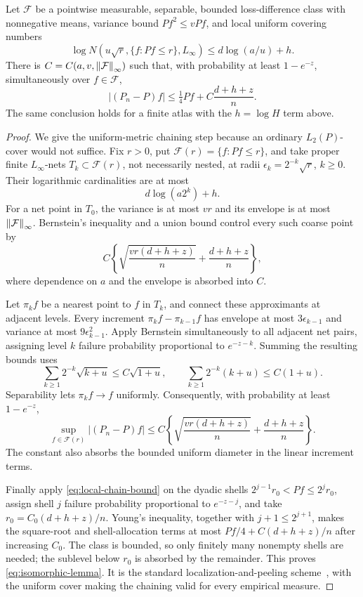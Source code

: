 \begin{lemma}
\label{lem:local-deviation}
Let \(\mathcal F\) be a pointwise measurable, separable, bounded loss-difference class with nonnegative means, variance bound \(Pf^2\le vPf\), and local uniform covering numbers
\[
\log N(u\sqrt r,\{f:Pf\le r\},L_\infty)
\le d\log(a/u)+h.
\]
There is \(C=C(a,v,\left\lVert \mathcal F\right\rVert_\infty)\) such that, with probability at least \(1-e^{-z}\), simultaneously over \(f\in\mathcal F\),
\begin{equation}
|(P_n-P)f|\le\tfrac14Pf+C\frac{d+h+z}{n}.
\label{eq:isomorphic-lemma}
\end{equation}
The same conclusion holds for a finite atlas with the \(h=\log H\) term above.
\end{lemma}

\begin{proof}
We give the uniform-metric chaining step because an ordinary
\(L_2(P)\)-cover would not suffice. Fix \(r>0\), put
\(\mathcal F(r)=\{f:Pf\le r\}\), and take proper finite
\(L_\infty\)-nets \(T_k\subset\mathcal F(r)\), not necessarily nested, at radii
\(\epsilon_k=2^{-k}\sqrt r\), \(k\ge0\). Their logarithmic cardinalities are
at most
\[
 d\log(a2^k)+h.
\]
For a net point in \(T_0\), the variance is at most \(vr\) and its envelope
is at most \(\left\lVert \mathcal F\right\rVert_\infty\). Bernstein's inequality and a union
bound control every such coarse point by
\[
 C\left\{\sqrt{\frac{vr(d+h+z)}n}
 +\frac{d+h+z}{n}\right\},
\]
where dependence on \(a\) and the envelope is absorbed into \(C\).

Let \(\pi_kf\) be a nearest point to \(f\) in \(T_k\), and connect these
approximants at adjacent levels. Every increment
\(\pi_kf-\pi_{k-1}f\) has envelope at most
\(3\epsilon_{k-1}\) and variance at most
\(9\epsilon_{k-1}^2\). Apply Bernstein simultaneously to all adjacent net
pairs, assigning level \(k\) failure probability proportional to
\(e^{-z-k}\). Summing the resulting bounds uses
\[
 \sum_{k\ge1}2^{-k}\sqrt{k+u}\le C\sqrt{1+u},
 \qquad
 \sum_{k\ge1}2^{-k}(k+u)\le C(1+u).
\]
Separability lets \(\pi_kf\to f\) uniformly. Consequently, with probability
at least \(1-e^{-z}\),
\begin{equation}
 \sup_{f\in\mathcal F(r)}|(P_n-P)f|
 \le C\left\{\sqrt{\frac{vr(d+h+z)}n}
 +\frac{d+h+z}{n}\right\}.
 \label{eq:local-chain-bound}
\end{equation}
The constant also absorbs the bounded uniform diameter in the linear
increment terms.

Finally apply \cref{eq:local-chain-bound} on the dyadic shells
\(2^{j-1}r_0<Pf\le2^jr_0\), assign shell \(j\) failure probability
proportional to \(e^{-z-j}\), and take
\(r_0=C_0(d+h+z)/n\). Young's inequality, together with
\(j+1\le2^{j+1}\), makes the square-root and shell-allocation terms at most
\(Pf/4+C(d+h+z)/n\) after increasing \(C_0\). The class is bounded, so only
finitely many nonempty shells are needed; the sublevel below \(r_0\) is
absorbed by the remainder. This proves \cref{eq:isomorphic-lemma}. It is the
standard localization-and-peeling scheme~\citep{koltchinskii2006local}, with
the uniform cover making the chaining valid for every empirical measure.
\end{proof}

